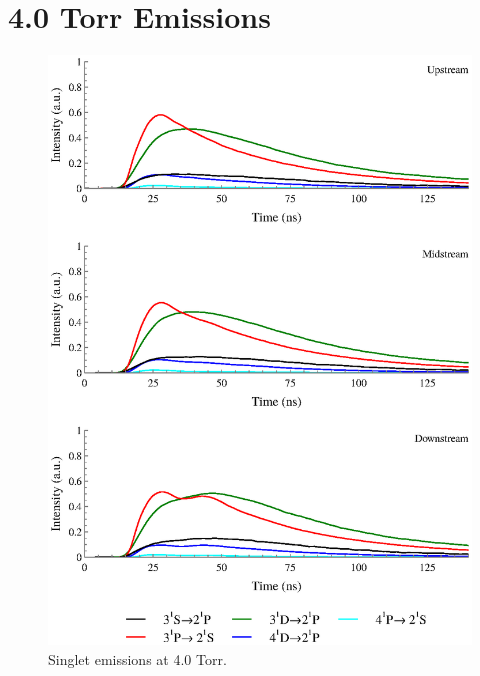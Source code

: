 \section{4.0 Torr Emissions}
\begin{figure}
  \centering
  \includegraphics{./chapters/extraem/figures/4torr_s.eps}
  \caption{Singlet emissions at 4.0 Torr.}
\end{figure}
